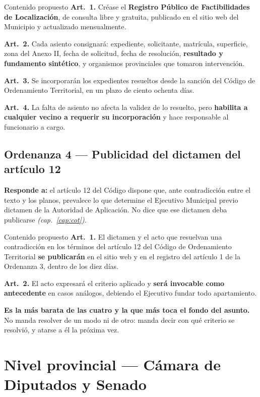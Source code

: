 \begin{ficha}{Contenido propuesto}
\textbf{Art.\ 1.} Créase el \textbf{Registro Público de Factibilidades de Localización}, de
consulta libre y gratuita, publicado en el sitio web del Municipio y actualizado
mensualmente.

\textbf{Art.\ 2.} Cada asiento consignará: expediente, solicitante, matrícula, superficie,
zona del Anexo II, fecha de solicitud, fecha de resolución, \textbf{resultado y fundamento
sintético}, y organismos provinciales que tomaron intervención.

\textbf{Art.\ 3.} Se incorporarán los expedientes resueltos desde la sanción del Código de
Ordenamiento Territorial, en un plazo de ciento ochenta días.

\textbf{Art.\ 4.} La falta de asiento no afecta la validez de lo resuelto, pero
\textbf{habilita a cualquier vecino a requerir su incorporación} y hace responsable al
funcionario a cargo.
\end{ficha}

\subsection{Ordenanza 4 --- Publicidad del dictamen del artículo 12}

\textbf{Responde a:} el artículo 12 del Código dispone que, ante contradicción entre el texto
y los planos, prevalece lo que determine el Ejecutivo Municipal previo dictamen de la
Autoridad de Aplicación. No dice que ese dictamen deba publicarse \textit{(cap.\ \ref{cap:cot})}.

\begin{ficha}{Contenido propuesto}
\textbf{Art.\ 1.} El dictamen y el acto que resuelvan una contradicción en los términos del
artículo 12 del Código de Ordenamiento Territorial \textbf{se publicarán} en el sitio web y en
el registro del artículo 1 de la Ordenanza 3, dentro de los diez días.

\textbf{Art.\ 2.} El acto expresará el criterio aplicado y \textbf{será invocable como
antecedente} en casos análogos, debiendo el Ejecutivo fundar todo apartamiento.
\end{ficha}

\textbf{Es la más barata de las cuatro y la que más toca el fondo del asunto.} No manda
resolver de un modo ni de otro: manda decir con qué criterio se resolvió, y atarse a él la
próxima vez.

\section{Nivel provincial --- Cámara de Diputados y Senado}

